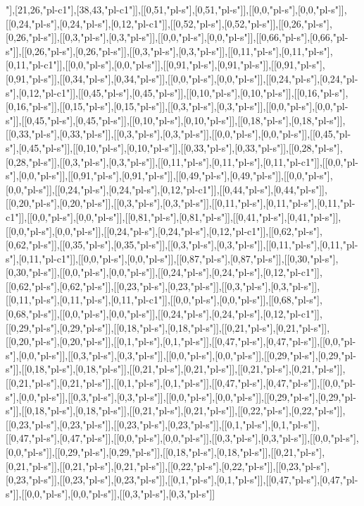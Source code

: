 "],[21,26,"pl-c1"],[38,43,"pl-c1"]],[[0,51,"pl-s"],[0,51,"pl-s"]],[[0,0,"pl-s"],[0,0,"pl-s"]],[[0,24,"pl-s"],[0,24,"pl-s"],[0,12,"pl-c1"]],[[0,52,"pl-s"],[0,52,"pl-s"]],[[0,26,"pl-s"],[0,26,"pl-s"]],[[0,3,"pl-s"],[0,3,"pl-s"]],[[0,0,"pl-s"],[0,0,"pl-s"]],[[0,66,"pl-s"],[0,66,"pl-s"]],[[0,26,"pl-s"],[0,26,"pl-s"]],[[0,3,"pl-s"],[0,3,"pl-s"]],[[0,11,"pl-s"],[0,11,"pl-s"],[0,11,"pl-c1"]],[[0,0,"pl-s"],[0,0,"pl-s"]],[[0,91,"pl-s"],[0,91,"pl-s"]],[[0,91,"pl-s"],[0,91,"pl-s"]],[[0,34,"pl-s"],[0,34,"pl-s"]],[[0,0,"pl-s"],[0,0,"pl-s"]],[[0,24,"pl-s"],[0,24,"pl-s"],[0,12,"pl-c1"]],[[0,45,"pl-s"],[0,45,"pl-s"]],[[0,10,"pl-s"],[0,10,"pl-s"]],[[0,16,"pl-s"],[0,16,"pl-s"]],[[0,15,"pl-s"],[0,15,"pl-s"]],[[0,3,"pl-s"],[0,3,"pl-s"]],[[0,0,"pl-s"],[0,0,"pl-s"]],[[0,45,"pl-s"],[0,45,"pl-s"]],[[0,10,"pl-s"],[0,10,"pl-s"]],[[0,18,"pl-s"],[0,18,"pl-s"]],[[0,33,"pl-s"],[0,33,"pl-s"]],[[0,3,"pl-s"],[0,3,"pl-s"]],[[0,0,"pl-s"],[0,0,"pl-s"]],[[0,45,"pl-s"],[0,45,"pl-s"]],[[0,10,"pl-s"],[0,10,"pl-s"]],[[0,33,"pl-s"],[0,33,"pl-s"]],[[0,28,"pl-s"],[0,28,"pl-s"]],[[0,3,"pl-s"],[0,3,"pl-s"]],[[0,11,"pl-s"],[0,11,"pl-s"],[0,11,"pl-c1"]],[[0,0,"pl-s"],[0,0,"pl-s"]],[[0,91,"pl-s"],[0,91,"pl-s"]],[[0,49,"pl-s"],[0,49,"pl-s"]],[[0,0,"pl-s"],[0,0,"pl-s"]],[[0,24,"pl-s"],[0,24,"pl-s"],[0,12,"pl-c1"]],[[0,44,"pl-s"],[0,44,"pl-s"]],[[0,20,"pl-s"],[0,20,"pl-s"]],[[0,3,"pl-s"],[0,3,"pl-s"]],[[0,11,"pl-s"],[0,11,"pl-s"],[0,11,"pl-c1"]],[[0,0,"pl-s"],[0,0,"pl-s"]],[[0,81,"pl-s"],[0,81,"pl-s"]],[[0,41,"pl-s"],[0,41,"pl-s"]],[[0,0,"pl-s"],[0,0,"pl-s"]],[[0,24,"pl-s"],[0,24,"pl-s"],[0,12,"pl-c1"]],[[0,62,"pl-s"],[0,62,"pl-s"]],[[0,35,"pl-s"],[0,35,"pl-s"]],[[0,3,"pl-s"],[0,3,"pl-s"]],[[0,11,"pl-s"],[0,11,"pl-s"],[0,11,"pl-c1"]],[[0,0,"pl-s"],[0,0,"pl-s"]],[[0,87,"pl-s"],[0,87,"pl-s"]],[[0,30,"pl-s"],[0,30,"pl-s"]],[[0,0,"pl-s"],[0,0,"pl-s"]],[[0,24,"pl-s"],[0,24,"pl-s"],[0,12,"pl-c1"]],[[0,62,"pl-s"],[0,62,"pl-s"]],[[0,23,"pl-s"],[0,23,"pl-s"]],[[0,3,"pl-s"],[0,3,"pl-s"]],[[0,11,"pl-s"],[0,11,"pl-s"],[0,11,"pl-c1"]],[[0,0,"pl-s"],[0,0,"pl-s"]],[[0,68,"pl-s"],[0,68,"pl-s"]],[[0,0,"pl-s"],[0,0,"pl-s"]],[[0,24,"pl-s"],[0,24,"pl-s"],[0,12,"pl-c1"]],[[0,29,"pl-s"],[0,29,"pl-s"]],[[0,18,"pl-s"],[0,18,"pl-s"]],[[0,21,"pl-s"],[0,21,"pl-s"]],[[0,20,"pl-s"],[0,20,"pl-s"]],[[0,1,"pl-s"],[0,1,"pl-s"]],[[0,47,"pl-s"],[0,47,"pl-s"]],[[0,0,"pl-s"],[0,0,"pl-s"]],[[0,3,"pl-s"],[0,3,"pl-s"]],[[0,0,"pl-s"],[0,0,"pl-s"]],[[0,29,"pl-s"],[0,29,"pl-s"]],[[0,18,"pl-s"],[0,18,"pl-s"]],[[0,21,"pl-s"],[0,21,"pl-s"]],[[0,21,"pl-s"],[0,21,"pl-s"]],[[0,21,"pl-s"],[0,21,"pl-s"]],[[0,1,"pl-s"],[0,1,"pl-s"]],[[0,47,"pl-s"],[0,47,"pl-s"]],[[0,0,"pl-s"],[0,0,"pl-s"]],[[0,3,"pl-s"],[0,3,"pl-s"]],[[0,0,"pl-s"],[0,0,"pl-s"]],[[0,29,"pl-s"],[0,29,"pl-s"]],[[0,18,"pl-s"],[0,18,"pl-s"]],[[0,21,"pl-s"],[0,21,"pl-s"]],[[0,22,"pl-s"],[0,22,"pl-s"]],[[0,23,"pl-s"],[0,23,"pl-s"]],[[0,23,"pl-s"],[0,23,"pl-s"]],[[0,1,"pl-s"],[0,1,"pl-s"]],[[0,47,"pl-s"],[0,47,"pl-s"]],[[0,0,"pl-s"],[0,0,"pl-s"]],[[0,3,"pl-s"],[0,3,"pl-s"]],[[0,0,"pl-s"],[0,0,"pl-s"]],[[0,29,"pl-s"],[0,29,"pl-s"]],[[0,18,"pl-s"],[0,18,"pl-s"]],[[0,21,"pl-s"],[0,21,"pl-s"]],[[0,21,"pl-s"],[0,21,"pl-s"]],[[0,22,"pl-s"],[0,22,"pl-s"]],[[0,23,"pl-s"],[0,23,"pl-s"]],[[0,23,"pl-s"],[0,23,"pl-s"]],[[0,1,"pl-s"],[0,1,"pl-s"]],[[0,47,"pl-s"],[0,47,"pl-s"]],[[0,0,"pl-s"],[0,0,"pl-s"]],[[0,3,"pl-s"],[0,3,"pl-s"]]
